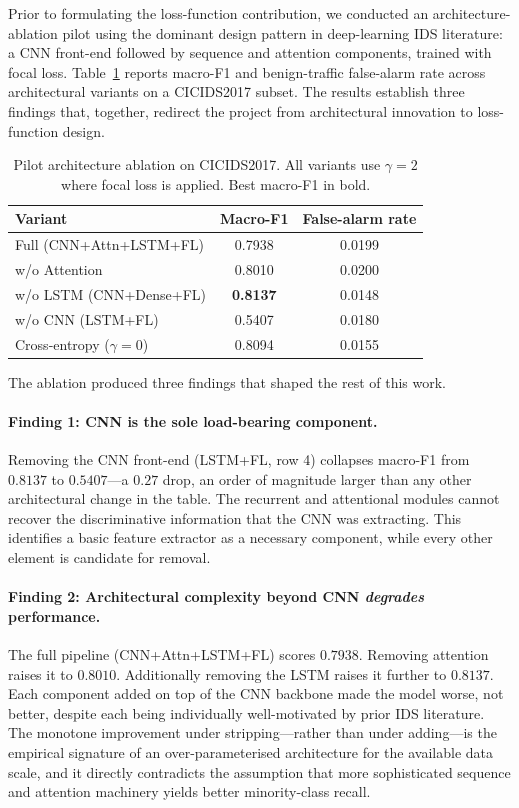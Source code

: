 \documentclass[conference]{IEEEtran}
\theoremstyle{definition}
\begin{document}
Prior to formulating the loss-function contribution, we conducted an architecture-ablation pilot using the dominant design pattern in deep-learning IDS literature: a CNN front-end followed by sequence and attention components, trained with focal loss. Table~\ref{tab:pilot} reports macro-F1 and benign-traffic false-alarm rate across architectural variants on a CICIDS2017 subset. The results establish three findings that, together, redirect the project from architectural innovation to loss-function design.

\begin{table}[t]
\caption{Pilot architecture ablation on CICIDS2017. All variants use $\gamma = 2$ where focal loss is applied. Best macro-F1 in bold.}
\label{tab:pilot}
\centering
\begin{tabular}{lcc}
\toprule
Variant & Macro-F1 & False-alarm rate \\
\midrule
Full (CNN+Attn+LSTM+FL) & 0.7938 & 0.0199 \\
\;\; w/o Attention      & 0.8010 & 0.0200 \\
\;\; w/o LSTM (CNN+Dense+FL) & \textbf{0.8137} & 0.0148 \\
\;\; w/o CNN (LSTM+FL)  & 0.5407 & 0.0180 \\
Cross-entropy ($\gamma{=}0$) & 0.8094 & 0.0155 \\
\bottomrule
\end{tabular}
\end{table}

The ablation produced three findings that shaped the rest of this work.

\paragraph{Finding 1: CNN is the sole load-bearing component.} Removing the CNN front-end (LSTM+FL, row 4) collapses macro-F1 from $0.8137$ to $0.5407$---a $0.27$ drop, an order of magnitude larger than any other architectural change in the table. The recurrent and attentional modules cannot recover the discriminative information that the CNN was extracting. This identifies a basic feature extractor as a necessary component, while every other element is candidate for removal.

\paragraph{Finding 2: Architectural complexity beyond CNN \emph{degrades} performance.} The full pipeline (CNN+Attn+LSTM+FL) scores $0.7938$. Removing attention raises it to $0.8010$. Additionally removing the LSTM raises it further to $0.8137$. Each component added on top of the CNN backbone made the model worse, not better, despite each being individually well-motivated by prior IDS literature. The monotone improvement under stripping---rather than under adding---is the empirical signature of an over-parameterised architecture for the available data scale, and it directly contradicts the assumption that more sophisticated sequence and attention machinery yields better minority-class recall.
\end{document}
